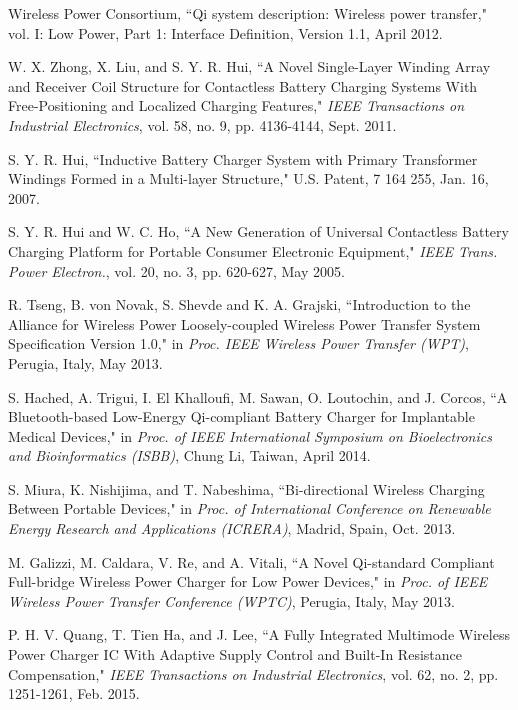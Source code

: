 \documentclass[twocolumn,10pt]{IEEEtran}
\begin{document}
\begin{thebibliography}{99}
Wireless Power Consortium, ``Qi system description: Wireless power transfer," vol. I: Low Power, Part 1: Interface Definition, Version 1.1, April 2012.

W. X. Zhong, X. Liu, and S. Y. R. Hui, ``A Novel Single-Layer Winding Array and Receiver Coil Structure for Contactless Battery Charging Systems With Free-Positioning and Localized Charging Features," \emph{IEEE Transactions on Industrial Electronics}, vol. 58, no. 9,	pp. 4136-4144, Sept. 2011. 

S. Y. R. Hui, ``Inductive Battery Charger System with Primary Transformer Windings Formed in a Multi-layer Structure," U.S. Patent, 7 164 255, Jan. 16, 2007.
 
S. Y. R. Hui and W. C. Ho, ``A New Generation of Universal Contactless Battery Charging Platform for Portable Consumer Electronic Equipment," \emph{IEEE Trans. Power Electron.},
vol. 20, no. 3, pp. 620-627, May 2005. 
 
R. Tseng, B. von Novak, S. Shevde and  K. A. Grajski,  ``Introduction to the Alliance for Wireless Power Loosely-coupled Wireless Power Transfer System Specification Version 1.0," in \emph{Proc. IEEE Wireless Power Transfer (WPT)}, Perugia, Italy, May 2013. 
 
S. Hached, A. Trigui, I. El Khalloufi, M. Sawan, O. Loutochin, and J. Corcos, ``A Bluetooth-based Low-Energy Qi-compliant Battery Charger for Implantable Medical Devices," in \emph{Proc. of IEEE International Symposium on Bioelectronics and Bioinformatics (ISBB)}, Chung Li, Taiwan, April 2014.   
 
S. Miura, K. Nishijima, and T. Nabeshima, ``Bi-directional Wireless Charging Between Portable Devices," in \emph{Proc. of International Conference on Renewable Energy Research and Applications (ICRERA)},   Madrid, Spain, Oct. 2013. 
 
M. Galizzi, M. Caldara, V. Re, and A. Vitali, ``A Novel Qi-standard Compliant Full-bridge Wireless Power Charger for Low Power Devices," in  \emph{Proc. of IEEE Wireless Power Transfer Conference (WPTC)},  Perugia, Italy, May 2013. 
 
P. H. V. Quang, T. Tien Ha, and J. Lee, ``A Fully Integrated Multimode Wireless Power Charger IC With Adaptive Supply Control and Built-In Resistance Compensation," \emph{IEEE Transactions on Industrial Electronics}, vol. 62, no. 2, pp. 1251-1261, Feb. 2015.   
 

\end{thebibliography}
\end{document}
